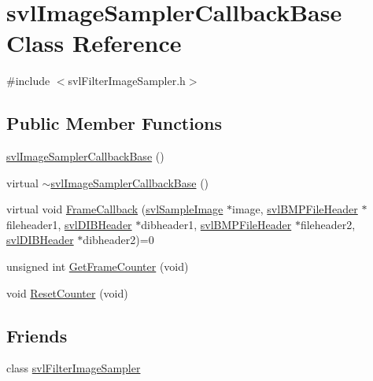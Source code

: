 \hypertarget{classsvl_image_sampler_callback_base}{\section{svl\-Image\-Sampler\-Callback\-Base Class Reference}
\label{classsvl_image_sampler_callback_base}
}


{\ttfamily \#include $<$svl\-Filter\-Image\-Sampler.\-h$>$}

\subsection*{Public Member Functions}
\begin{DoxyCompactItemize}
\item 
\hyperlink{classsvl_image_sampler_callback_base_aa7b548ba866bd5549405bc2494202f0b}{svl\-Image\-Sampler\-Callback\-Base} ()
\item 
virtual \hyperlink{classsvl_image_sampler_callback_base_a89e051df92799624d8bad05508088833}{$\sim$svl\-Image\-Sampler\-Callback\-Base} ()
\item 
virtual void \hyperlink{classsvl_image_sampler_callback_base_a178efc582b3ed25af575d3b2268104d1}{Frame\-Callback} (\hyperlink{classsvl_sample_image}{svl\-Sample\-Image} $\ast$image, \hyperlink{structsvl_b_m_p_file_header}{svl\-B\-M\-P\-File\-Header} $\ast$fileheader1, \hyperlink{structsvl_d_i_b_header}{svl\-D\-I\-B\-Header} $\ast$dibheader1, \hyperlink{structsvl_b_m_p_file_header}{svl\-B\-M\-P\-File\-Header} $\ast$fileheader2, \hyperlink{structsvl_d_i_b_header}{svl\-D\-I\-B\-Header} $\ast$dibheader2)=0
\item 
unsigned int \hyperlink{classsvl_image_sampler_callback_base_a4c6993fe52c7496c0038ebad7c579f7c}{Get\-Frame\-Counter} (void)
\item 
void \hyperlink{classsvl_image_sampler_callback_base_a49ab50ab94f65c2b6998855f89714b33}{Reset\-Counter} (void)
\end{DoxyCompactItemize}
\subsection*{Friends}
\begin{DoxyCompactItemize}
\item 
class \hyperlink{classsvl_image_sampler_callback_base_a4f292ca39b01a4b78066fa6da1d081d4}{svl\-Filter\-Image\-Sampler}
\end{DoxyCompactItemize}


